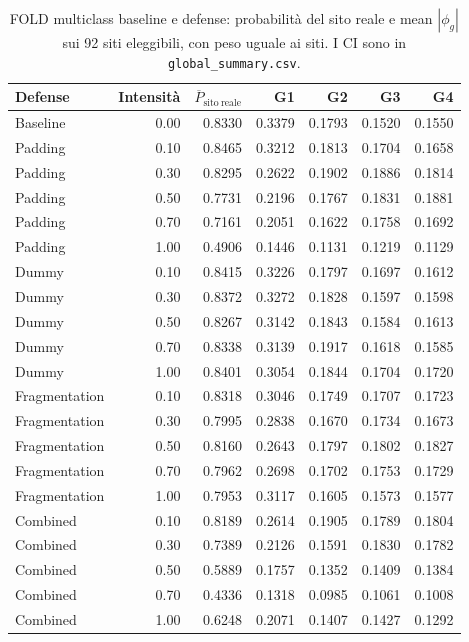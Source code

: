 \documentclass[11pt,a4paper]{article}
\begin{document}
\clearpage
\begin{table}[htbp]
\centering\footnotesize
\caption{FOLD multiclass baseline e defense: probabilità del sito reale e mean $|\phi_g|$ sui 92 siti eleggibili, con peso uguale ai siti. I CI sono in \texttt{global\_summary.csv}.}
\label{tab:crossrun-defense-xai}
\begin{tabular}{lrrrrrr}
\toprule
Defense & Intensità & $\overline P_{\mathrm{sito\ reale}}$ & G1 & G2 & G3 & G4 \\
\midrule
Baseline & 0.00 & 0.8330 & 0.3379 & 0.1793 & 0.1520 & 0.1550 \\
Padding & 0.10 & 0.8465 & 0.3212 & 0.1813 & 0.1704 & 0.1658 \\
Padding & 0.30 & 0.8295 & 0.2622 & 0.1902 & 0.1886 & 0.1814 \\
Padding & 0.50 & 0.7731 & 0.2196 & 0.1767 & 0.1831 & 0.1881 \\
Padding & 0.70 & 0.7161 & 0.2051 & 0.1622 & 0.1758 & 0.1692 \\
Padding & 1.00 & 0.4906 & 0.1446 & 0.1131 & 0.1219 & 0.1129 \\
Dummy & 0.10 & 0.8415 & 0.3226 & 0.1797 & 0.1697 & 0.1612 \\
Dummy & 0.30 & 0.8372 & 0.3272 & 0.1828 & 0.1597 & 0.1598 \\
Dummy & 0.50 & 0.8267 & 0.3142 & 0.1843 & 0.1584 & 0.1613 \\
Dummy & 0.70 & 0.8338 & 0.3139 & 0.1917 & 0.1618 & 0.1585 \\
Dummy & 1.00 & 0.8401 & 0.3054 & 0.1844 & 0.1704 & 0.1720 \\
Fragmentation & 0.10 & 0.8318 & 0.3046 & 0.1749 & 0.1707 & 0.1723 \\
Fragmentation & 0.30 & 0.7995 & 0.2838 & 0.1670 & 0.1734 & 0.1673 \\
Fragmentation & 0.50 & 0.8160 & 0.2643 & 0.1797 & 0.1802 & 0.1827 \\
Fragmentation & 0.70 & 0.7962 & 0.2698 & 0.1702 & 0.1753 & 0.1729 \\
Fragmentation & 1.00 & 0.7953 & 0.3117 & 0.1605 & 0.1573 & 0.1577 \\
Combined & 0.10 & 0.8189 & 0.2614 & 0.1905 & 0.1789 & 0.1804 \\
Combined & 0.30 & 0.7389 & 0.2126 & 0.1591 & 0.1830 & 0.1782 \\
Combined & 0.50 & 0.5889 & 0.1757 & 0.1352 & 0.1409 & 0.1384 \\
Combined & 0.70 & 0.4336 & 0.1318 & 0.0985 & 0.1061 & 0.1008 \\
Combined & 1.00 & 0.6248 & 0.2071 & 0.1407 & 0.1427 & 0.1292 \\
\bottomrule
\end{tabular}
\end{table}
\end{document}
